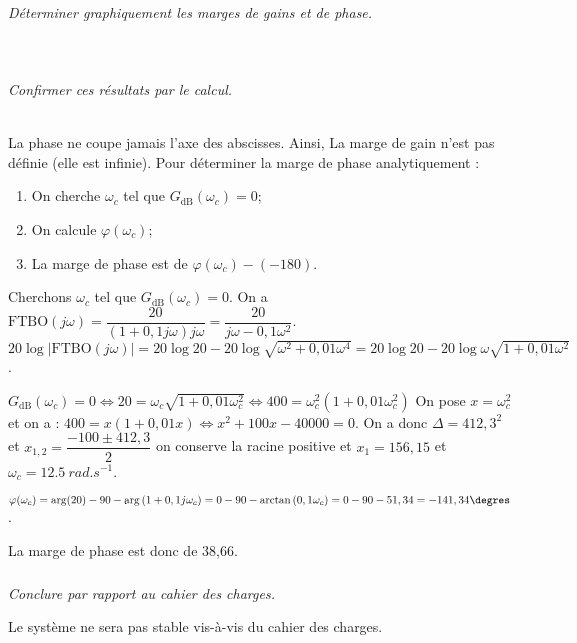\begin{multicols}{2}
\subparagraph{}\textit{Déterminer graphiquement les marges de gains et de phase.}
\ifprof
\begin{corrige}~\\
\end{corrige}
\else
\fi

\subparagraph{}\textit{Confirmer ces résultats par le calcul.}
\ifprof
\begin{corrige}~\\
La phase ne coupe jamais l'axe des abscisses. Ainsi, La marge de gain n'est pas définie (elle est infinie).
Pour déterminer la marge de phase analytiquement :
\begin{enumerate}
\item On cherche $\omega_c$ tel que $G_{\text{dB}}(\omega_c)=0$;
\item On calcule $\varphi(\omega_c)$;
\item La marge de phase est de $\varphi(\omega_c) -(-180)$.
\end{enumerate}

Cherchons $\omega_c$ tel que $G_{\text{dB}}(\omega_c)=0$. 
On a ${\text{FTBO}}(j\omega )
=\dfrac{20}{(1+0,1j\omega)j\omega}
=\dfrac{20}{j\omega-0,1\omega^2}$. 
$20\log |{\text{FTBO}}(j\omega )| 
= 20\log 20 - 20\log \sqrt{\omega^2+0,01\omega^4}
= 20\log 20 - 20\log \omega\sqrt{1+0,01\omega^2}$.

 $G_{\text{dB}}(\omega_c)=0 
\Leftrightarrow   20 =\omega_c\sqrt{1+0,01\omega_c^2} 
\Leftrightarrow   400 =\omega_c^2 \left(1+0,01\omega_c^2\right)$
On pose $x=\omega_c^2$ et on a :
$400 =x \left(1+0,01x\right)\Leftrightarrow x^2+100x-40000=0$. 
On a donc $\Delta = 412,3^2$ et $x_{1,2}=\dfrac{-100\pm412,3}{2}$ on conserve la racine positive et  $x_1=156,15$ et $\omega_c=\SI{12,5}{rad.s^{-1}}$.

$\varphi(\omega_c)=\arg(20)-90 -\arg\left(1+0,1j\omega_c \right)
=0- 90 -\arctan\left( 0,1\omega_c \right)
=0-90-51,34=-141,34\degres$.

La marge de phase est donc de 38,66\degres.
\end{corrige}
\else
\fi

\subparagraph{}\textit{Conclure par rapport au cahier des charges.}
\ifprof
\begin{corrige}
Le système ne sera pas stable vis-à-vis du cahier des charges.
\end{corrige}
\else
\fi

\ifprof


\end{multicols}

